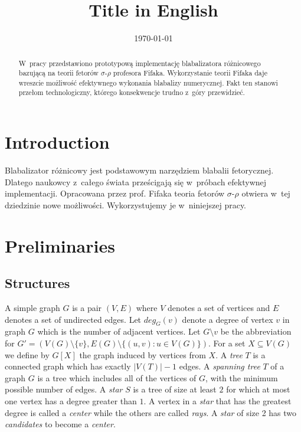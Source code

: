 \documentclass[en]{pracamgr}
\title{Title in English}
\date{\monthyeardate\today}
\begin{document}
\maketitle

\begin{abstract}
  W~pracy przedstawiono prototypową implementację blabalizatora
  różnicowego bazującą na teorii fetorów $\sigma$-$\rho$ profesora
  Fifaka.  Wykorzystanie teorii Fifaka daje wreszcie możliwość
  efektywnego wykonania blabalizy numerycznej.  Fakt ten stanowi
  przełom technologiczny, którego konsekwencje trudno z~góry
  przewidzieć.
\end{abstract}

\tableofcontents

\chapter*{Introduction}

Blabalizator różnicowy jest podstawowym narzędziem blabalii
fetorycznej.  Dlatego naukowcy z~całego świata prześcigają się
w~próbach efektywnej implementacji.  Opracowana przez prof. Fifaka
teoria fetorów $\sigma$-$\rho$ otwiera w~tej dziedzinie nowe
możliwości.  Wykorzystujemy je w~niniejszej pracy.

\chapter{Preliminaries}\label{r:pojecia}

\section{Structures}

A simple graph $G$ is a pair $(V,E)$ where $V$ denotes a set of vertices and $E$ denotes a set of undirected edges. Let $deg_G(v)$ denote a degree of vertex $v$ in graph $G$ which is the number of adjacent vertices. Let $G \setminus v$ be the abbreviation for $G'=(V(G) \setminus \{v\}, E(G) \setminus \{(u,v): u \in V(G)\})$. For a set $X \subseteq V(G)$ we define by $G[X]$ the graph induced by vertices from $X$. A \emph{tree} $T$ is a connected graph which has exactly $|V(T)|-1$ edges. A \emph{spanning tree} $T$ of a graph $G$ is a tree which includes all of the vertices of $G$, with the minimum possible number of edges. A \emph{star} $S$ is a tree of size at least $2$ for which at most one vertex has a degree greater than $1$. A vertex in a \emph{star} that has the greatest degree is called a \emph{center} while the others are called \emph{rays}. A \emph{star} of size 2 has two \emph{candidates} to become a \emph{center}.
\end{document}
